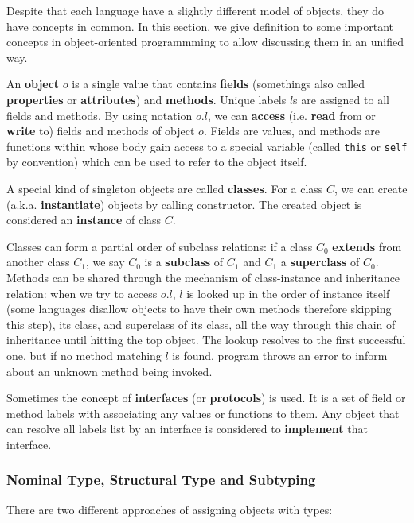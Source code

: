 Despite that each language have a slightly different model of objects, they do have concepts
in common.
In this section, we give definition to some important concepts in object-oriented programmming
to allow discussing them in an unified way.

An \textbf{object} $o$ is a single value that contains \textbf{fields} (somethings also called
\textbf{properties} or \textbf{attributes}) and \textbf{methods}.
Unique labels $l$s are assigned to all fields and methods. By using notation $o.l$, we can \textbf{access}
(i.e. \textbf{read} from or \textbf{write} to) fields and methods of object $o$.
Fields are values, and methods are functions within whose body gain access to a special variable
(called \texttt{this} or \texttt{self} by convention) which can be used to refer to the object itself.

A special kind of singleton objects are called \textbf{classes}.
For a class $C$, we can create (a.k.a. \textbf{instantiate}) objects by calling constructor.
The created object is considered an \textbf{instance} of class $C$.

Classes can form a partial order of subclass relations: if a class $C_0$ \textbf{extends} from
another class $C_1$, we say $C_0$ is a \textbf{subclass} of $C_1$ and $C_1$ a \textbf{superclass} of $C_0$.
Methods can be shared through the mechanism of class-instance and inheritance relation:
when we try to access $o.l$, $l$ is looked up in the order of instance itself (some languages disallow
objects to have their own methods therefore skipping this step), its class, and superclass of its class,
all the way through this chain of inheritance until hitting the top object.
The lookup resolves to the first successful one,
but if no method matching $l$ is found, program throws an error to inform about an unknown method being invoked.

Sometimes the concept of \textbf{interfaces} (or \textbf{protocols}) is used. It is a set of
field or method labels with associating any values or functions to them.
Any object that can resolve all labels list by an interface is considered to
\textbf{implement} that interface.

\subsubsection{Nominal Type, Structural Type and Subtyping}

There are two different approaches of assigning objects with types:

